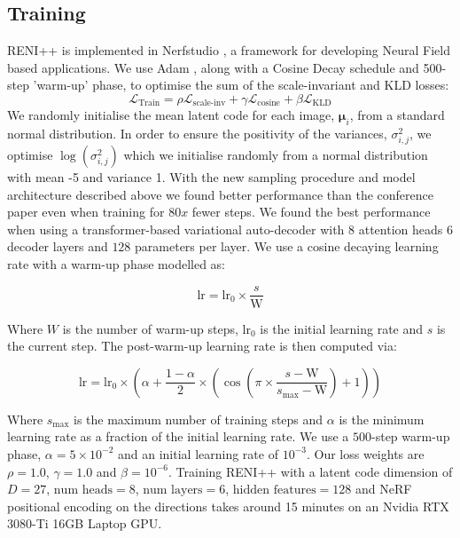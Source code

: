 \subsection{Training} \label{Training Details}
RENI++ is implemented in Nerfstudio \cite{nerfstudio}, a framework for developing Neural Field based applications. We use Adam \cite{kingma_adam_2015}, along with a Cosine Decay \cite{loshchilov2017sgdr} schedule and 500-step 'warm-up' phase, to optimise the sum of the scale-invariant and KLD losses:
\begin{equation}\label{training_loss}
    \mathcal{L}_{\text{Train}} = \rho \mathcal{L}_{\text{scale-inv}} + \gamma \mathcal{L}_{\text{cosine}} + \beta \mathcal{L}_{\text{KLD}}
\end{equation}
We randomly initialise the mean latent code for each image, \(\boldsymbol{\mu}_{i}\), from a standard normal distribution. In order to ensure the positivity of the variances, $\sigma^2_{i,j}$, we optimise $\log(\sigma^2_{i,j})$ which we initialise randomly from a normal distribution with mean -5 and variance 1. With the new sampling procedure and model architecture described above we found better performance than the conference paper even when training for $80x$ fewer steps. We found the best performance when using a transformer-based variational auto-decoder with $8$ attention heads $6$ decoder layers and $128$ parameters per layer. We use a cosine decaying learning rate \cite{loshchilov2017sgdr} with a warm-up phase modelled as:

$$\text{lr} = \text{lr}_{0} \times \frac{s}{\text{W}}$$

Where $W$ is the number of warm-up steps, $\text{lr}_{0}$ is the initial learning rate and $s$ is the current step. The post-warm-up learning rate is then computed via:

$$\text{lr} = \text{lr}_{0} \times \left( \alpha + \frac{1 - \alpha}{2} \times (\cos(\pi \times \frac{s - \text{W}}{s_{\text{max}} - \text{W}}) + 1) \right) $$

Where $s_\text{max}$ is the maximum number of training steps and $\alpha$ is the minimum learning rate as a fraction of the initial learning rate. We use a $500$-step warm-up phase, $\alpha = 5 \times 10^{-2}$ and an initial learning rate of \(10^{-3}\). Our loss weights are \(\rho=1.0\), \(\gamma=1.0\) and \(\beta=10^{-6}\). Training RENI++ with a latent code dimension of $D = 27$, $\text{num heads} = 8$, $\text{num layers} = 6$, $\text{hidden features} = 128$ and NeRF \cite{mildenhall_nerf_2020} positional encoding on the directions takes around 15 minutes on an Nvidia RTX 3080-Ti 16GB Laptop GPU.

